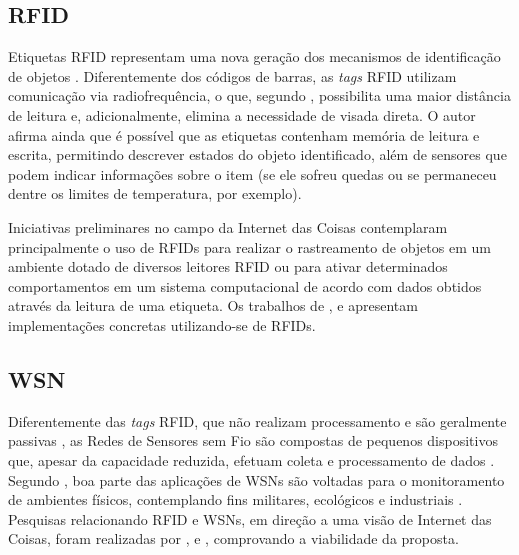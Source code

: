 \documentclass[twoside,english,brazilian]{UNISINOSmonografia}
\begin{document}

\subsection{RFID}
	Etiquetas RFID representam uma nova geração dos mecanismos de 
	identificação de objetos \cite{Brock2001}. Diferentemente dos códigos de 
	barras, as \textit{tags} RFID utilizam comunicação via radiofrequência, o 
	que, segundo , possibilita uma maior distância de 
	leitura e, adicionalmente, elimina a necessidade de visada direta. O autor 
	afirma ainda que é possível que as etiquetas contenham memória de leitura 
	e escrita, permitindo descrever estados do objeto identificado, além de 
	sensores que podem indicar informações sobre o item (se ele sofreu quedas 
	ou se permaneceu dentre os limites de temperatura, por exemplo).
	
	Iniciativas preliminares no campo da Internet das Coisas contemplaram 
	principalmente o uso de RFIDs para realizar o rastreamento de objetos em 
	um ambiente dotado de diversos leitores RFID ou para ativar determinados 
	comportamentos em um sistema computacional de acordo com dados obtidos 
	através da leitura de uma etiqueta. Os trabalhos de , 
	 e  apresentam 
	implementações concretas utilizando-se de RFIDs.

\subsection{WSN}
	Diferentemente das \textit{tags} RFID, que não realizam processamento e 
	são geralmente passivas \cite{Atzori2010b}, as Redes de Sensores sem Fio 
	são compostas de pequenos dispositivos que, apesar da capacidade reduzida, 
	efetuam coleta e processamento de dados \cite{Sakthidharan2012}. Segundo 
	, boa parte das aplicações de WSNs são voltadas para 
	o monitoramento de ambientes físicos, contemplando fins militares, 
	ecológicos e industriais \cite{Suhonen2012}. Pesquisas relacionando RFID e 
	WSNs, em direção a uma visão de Internet das Coisas, foram realizadas por 
	,  e , 
	comprovando a viabilidade da proposta.
	
\end{document}
